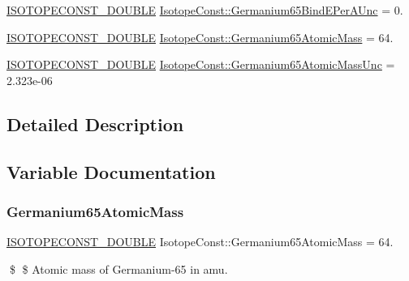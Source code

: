 \begin{DoxyCompactItemize}
\mbox{\hyperlink{group___isotope_const-_macros_ga8f45a7272ce02c0b4c65c44636ed719a}{I\+S\+O\+T\+O\+P\+E\+C\+O\+N\+S\+T\+\_\+\+D\+O\+U\+B\+LE}} \mbox{\hyperlink{group___isotope_const-_germanium-_ge65_gaa14ecb8c2611afae5ba4cf605cfb3fd7}{Isotope\+Const\+::\+Germanium65\+Bind\+E\+Per\+A\+Unc}} = 0.
\item 
\mbox{\hyperlink{group___isotope_const-_macros_ga8f45a7272ce02c0b4c65c44636ed719a}{I\+S\+O\+T\+O\+P\+E\+C\+O\+N\+S\+T\+\_\+\+D\+O\+U\+B\+LE}} \mbox{\hyperlink{group___isotope_const-_germanium-_ge65_ga8c1dd2e764bb7dc40d089bbbb32c0003}{Isotope\+Const\+::\+Germanium65\+Atomic\+Mass}} = 64.
\item 
\mbox{\hyperlink{group___isotope_const-_macros_ga8f45a7272ce02c0b4c65c44636ed719a}{I\+S\+O\+T\+O\+P\+E\+C\+O\+N\+S\+T\+\_\+\+D\+O\+U\+B\+LE}} \mbox{\hyperlink{group___isotope_const-_germanium-_ge65_ga77151e1a9cd868dae0ebeae91b9cd8be}{Isotope\+Const\+::\+Germanium65\+Atomic\+Mass\+Unc}} = 2.\+323e-\/06
\end{DoxyCompactItemize}


\subsection{Detailed Description}


\subsection{Variable Documentation}
\mbox{\label{group___isotope_const-_germanium-_ge65_ga8c1dd2e764bb7dc40d089bbbb32c0003}} 
\subsubsection{\texorpdfstring{Germanium65\+Atomic\+Mass}{Germanium65AtomicMass}}
{\footnotesize\ttfamily \mbox{\hyperlink{group___isotope_const-_macros_ga8f45a7272ce02c0b4c65c44636ed719a}{I\+S\+O\+T\+O\+P\+E\+C\+O\+N\+S\+T\+\_\+\+D\+O\+U\+B\+LE}} Isotope\+Const\+::\+Germanium65\+Atomic\+Mass = 64.}

\$ \$ Atomic mass of Germanium-\/65 in amu. \mbox{\label{group___isotope_const-_germanium-_ge65_ga77151e1a9cd868dae0ebeae91b9cd8be}} 
